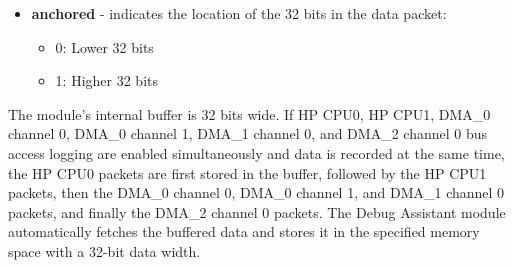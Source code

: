 \documentclass[main\_\_EN.tex]{subfiles}
\begin{document}
\begin{itemize}
\begin{itemize}
        \begin{itemize}
            \item 0: DMA\_0 channel 0 packets were not discarded
            \item 1: DMA\_0 channel 0 packets were discarded
        \end{itemize}
        \item Bit[9]:
        \begin{itemize}
            \item 0: DMA\_0 channel 1 packets were not discarded
            \item 1: DMA\_0 channel 1 packets were discarded
        \end{itemize}
        \item Bit[10]:
        \begin{itemize}
            \item 0: DMA\_1 channel 0 packets were not discarded
            \item 1: DMA\_1 channel 0 packets were discarded
        \end{itemize}
        \item Bit[11]:
        \begin{itemize}
            \item 0: DMA\_2 channel 0 packets were not discarded
            \item 1: DMA\_2 channel 0 packets were discarded
        \end{itemize}
    \end{itemize}
    \item \textbf{anchored} - indicates the location of the 32 bits in the data packet:
    \begin{itemize}
        \item 0: Lower 32 bits
        \item 1: Higher 32 bits
    \end{itemize}
\end{itemize}

The module's internal buffer is 32 bits wide. If HP CPU0, HP CPU1, DMA\_0 channel 0, DMA\_0 channel 1, DMA\_1 channel 0, and DMA\_2 channel 0 bus access logging are enabled simultaneously and data is recorded at the same time, the HP CPU0 packets are first stored in the buffer, followed by the HP CPU1 packets, then the DMA\_0 channel 0, DMA\_0 channel 1, and DMA\_1 channel 0 packets, and finally the DMA\_2 channel 0 packets. The Debug Assistant module automatically fetches the buffered data and stores it in the specified memory space with a 32-bit data width.
\end{document}
